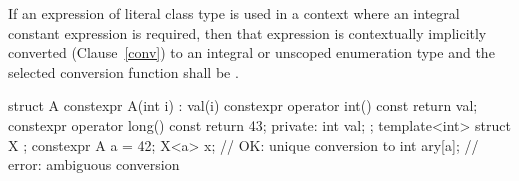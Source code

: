 \pnum
If an expression of literal class type is used in a context where an 
integral constant expression is required, then that expression is
contextually implicitly converted (Clause~\ref{conv}) to an integral or unscoped
enumeration type 
and the selected conversion function shall be . \begin{example}
\begin{codeblock}
struct A { 
  constexpr A(int i) : val(i) { } 
  constexpr operator int() const { return val; }
  constexpr operator long() const { return 43; }
private: 
  int val; 
}; 
template<int> struct X { }; 
constexpr A a = 42; 
X<a> x;             // OK: unique conversion to 
int ary[a];         // error: ambiguous conversion 
\end{codeblock}
\end{example}%
